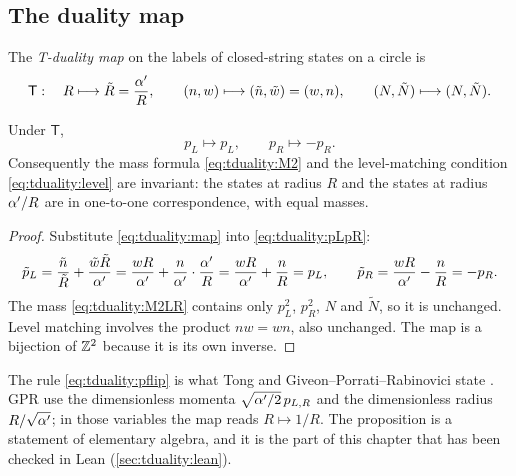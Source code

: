 \subsection{The duality map}

\begin{definition}\label{def:tduality:map}
The \emph{T-duality map} on the labels of closed-string states on a circle is
\begin{equation}\label{eq:tduality:map}
  \mathsf T:\quad R\longmapsto\tilde R=\frac{\alpha'}{R},\qquad (n,w)\longmapsto(\tilde n,\tilde w)=(w,n),
  \qquad (N,\tilde N)\longmapsto(N,\tilde N).
\end{equation}
\end{definition}

\begin{proposition}\label{thm:tduality:pLpR}
Under $\mathsf T$,
\begin{equation}\label{eq:tduality:pflip}
  p_L\longmapsto p_L,\qquad p_R\longmapsto-p_R .
\end{equation}
Consequently the mass formula \eqref{eq:tduality:M2} and the level-matching condition
\eqref{eq:tduality:level} are invariant: the states at radius $R$ and the states at radius
$\alpha'/R$ are in one-to-one correspondence, with equal masses.
\end{proposition}

\begin{proof}
Substitute \eqref{eq:tduality:map} into \eqref{eq:tduality:pLpR}:
\[
  \tilde p_L=\frac{\tilde n}{\tilde R}+\frac{\tilde w\tilde R}{\alpha'}
    =\frac{wR}{\alpha'}+\frac{n}{\alpha'}\cdot\frac{\alpha'}{R}=\frac{wR}{\alpha'}+\frac nR=p_L,\qquad
  \tilde p_R=\frac{wR}{\alpha'}-\frac nR=-p_R .
\]
The mass \eqref{eq:tduality:M2LR} contains only $p_L^2$, $p_R^2$, $N$ and $\tilde N$, so it is
unchanged. Level matching involves the product $nw=wn$, also unchanged. The map is a bijection
of $\mathbb{Z}^2$ because it is its own inverse.
\end{proof}

The rule \eqref{eq:tduality:pflip} is what Tong and Giveon--Porrati--Rabinovici state
. GPR use the
dimensionless momenta $\sqrt{\alpha'/2}\,p_{L,R}$ and the dimensionless radius $R/\sqrt{\alpha'}$; in
those variables the map reads $R\mapsto1/R$. The proposition is a statement of elementary algebra,
and it is the part of this chapter that has been checked in Lean (\cref{sec:tduality:lean}).


